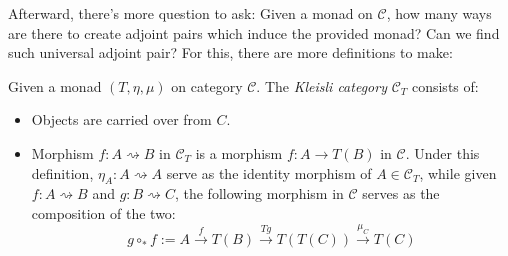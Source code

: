 \documentclass{article}
\begin{document}
Afterward, there's more question to ask: Given a monad on $\mathcal{C}$, how many ways are there to create adjoint pairs which induce the provided monad? Can we find such universal adjoint pair? For this, there are more definitions to make:
\begin{defn}
    Given a monad $(T,\eta,\mu)$ on category $\mathcal{C}$. The \emph{Kleisli category} $\mathcal{C}_T$ consists of:
    \begin{itemize}
        \item Objects are carried over from $C$.
        \item Morphism $f:A\rightsquigarrow B$ in $\mathcal{C}_T$ is a morphism $f:A\rightarrow T(B)$ in $\mathcal{C}$. Under this definition, $\eta_A:A\rightsquigarrow A$ serve as the identity morphism of $A\in\mathcal{C}_T$, while given $f:A\rightsquigarrow B$ and $g:B\rightsquigarrow C$, the following morphism in $\mathcal{C}$ serves as the composition of the two:
        \[g\circ_* f:= A \xrightarrow{f} T(B) \xrightarrow{Tg} T(T(C)) \xrightarrow{\mu_C}T(C)\]
    \end{itemize}
\end{defn}
\end{document}

